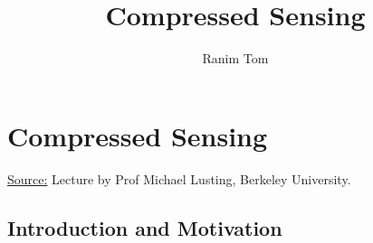 \documentclass[12pt,a4paper]{book}
\title{Compressed Sensing}
\author{Ranim Tom}
\begin{document}
\maketitle

\tableofcontents

\pagestyle{fancy}
\fancyhf{} %
\rhead{\rightmark}


\chapter{Compressed Sensing}

\underline{Source:} Lecture by Prof Michael Lusting, Berkeley University.\\


\section{Introduction and Motivation}
\end{document}
